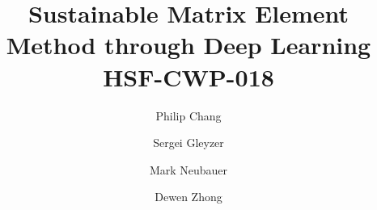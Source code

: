 \usepackage[utf8]{inputenc}
\usepackage[USenglish]{babel}
\usepackage{enumitem}
\usepackage{tikz}
\usepackage{verbatim}
\usepackage{authblk}

\usepackage[a4paper,margin=2cm]{geometry}%

\usepackage{fancyhdr}
\pagestyle{fancy}
\fancyhf{}
\chead{}
\cfoot{\thepage}
\renewcommand{\headrulewidth}{1.0pt}

\title{Sustainable Matrix Element Method through Deep Learning \\ 
\vspace{2mm} 
\large HSF-CWP-018 \\
}

\author[1]{Philip Chang}
\author[2]{Sergei Gleyzer}
\author[3]{Mark Neubauer}
\author[1]{Dewen Zhong}



\renewcommand\Authands{ and }


\usepackage{hyperref}
\hypersetup{
  colorlinks=true,       %
  linkcolor=black,          %
  citecolor=green,        %
  filecolor=magenta,      %
  urlcolor=blue           %
}

\usepackage{amssymb}%
\usepackage{amsmath}
\usepackage{pifont}%
\providecommand{\xmark}{\ding{55}}%

\usepackage[backend=biber,defernumbers=true,sorting=none,firstinits=true,natbib=true,style=numeric-comp]{biblatex}


